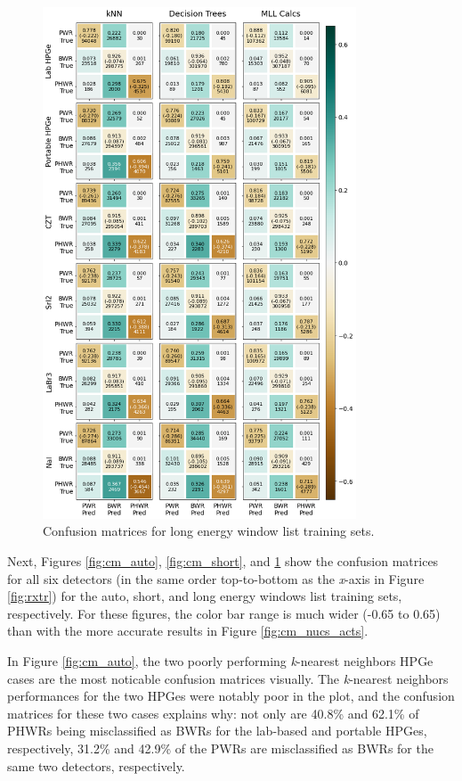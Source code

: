 \begin{figure}[!htbp]
  \centering
  \includegraphics[width=0.83\textwidth]{./chapters/exp2/confusion_matrix_6dets_long.png}
  \caption{Confusion matrices for long energy window list training sets.}
  \label{fig:cm_long}
\end{figure}

Next, Figures \ref{fig:cm_auto}, \ref{fig:cm_short}, and \ref{fig:cm_long} show
the confusion matrices for all six detectors (in the same order top-to-bottom
as the \textit{x}-axis in Figure \ref{fig:rxtr}) for the auto, short, and long
energy windows list training sets, respectively. For these figures, the color
bar range is much wider (-0.65 to 0.65) than with the more accurate results in
Figure \ref{fig:cm_nucs_acts}. 

In Figure \ref{fig:cm_auto}, the two poorly performing \textit{k}-nearest
neighbors \gls{HPGe} cases are the most noticable confusion matrices visually.
The \textit{k}-nearest neighbors performances for the two \gls{HPGe}s were
notably poor in the plot, and the confusion matrices for these two cases
explains why: not only are 40.8\% and 62.1\% of \gls{PHWR}s being misclassified
as \gls{BWR}s for the lab-based and portable \gls{HPGe}s, respectively, 31.2\%
and 42.9\% of the \gls{PWR}s are misclassified as \gls{BWR}s for the same two
detectors, respectively.

